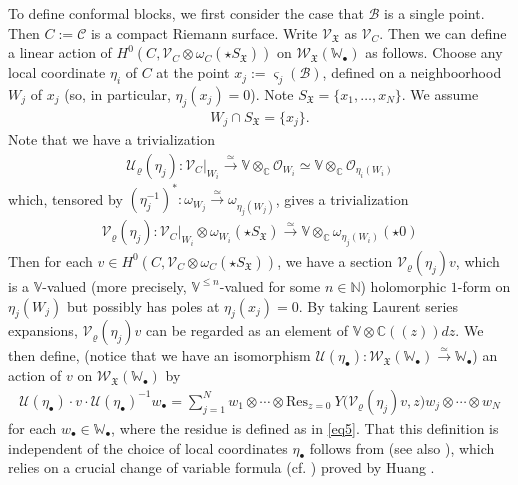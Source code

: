 \documentclass[12pt,a4paper,notitlepage]{article}
\theoremstyle{definition}
\theoremstyle{plain}
\newcommand{\fk}{\mathfrak}
\newcommand{\mc}{\mathcal}
\newcommand{\Res}{\mathrm{Res}}
\newcommand{\scr}{\mathscr}
\newcommand{\sgm}{\varsigma}
\newcommand{\SX}{{S_{\fk X}}}
\newcommand{\blt}{\bullet}
\newcommand{\Vbb}{\mathbb V}
\newcommand{\Wbb}{\mathbb W}
\newcommand{\Cbb}{\mathbb C}
\newcommand{\Nbb}{\mathbb N}
\numberwithin{equation}{section}
\begin{document}


To define conformal blocks, we first consider the case that $\mc B$ is a single point. Then $C:=\mc C$ is a compact Riemann surface. Write $\scr V_{\fk X}$ as $\scr V_C$. Then we can define a linear action of $H^0(C,\scr V_C\otimes\omega_C(\star\SX))$ on $\scr W_{\fk X}(\Wbb_\blt)$ as follows. Choose any local coordinate $\eta_i$ of $C$ at the point $x_j:=\sgm_j(\mc B)$, defined on a neighboorhood $W_j$ of $x_j$ (so, in particular, $\eta_j(x_j)=0$). Note $\SX=\{x_1,\dots,x_N\}$. We assume
\begin{align*}
W_j\cap\SX=\{x_j\}.	
\end{align*}
Note that we have a trivialization
\begin{align*}
\mc U_\varrho(\eta_j):\scr V_C|_{W_i}\xrightarrow{\simeq} \Vbb\otimes_\Cbb\scr O_{W_i}\simeq	\Vbb\otimes_\Cbb\scr O_{\eta_i(W_i)}
\end{align*} 
which, tensored by $(\eta_j^{-1})^*:\omega_{W_j}\xrightarrow{\simeq}\omega_{\eta_j(W_j)}$, gives a trivialization \index{V@$\mc V_\varrho(\eta_j)$}
\begin{align*}
\mc V_\varrho(\eta_j):\scr V_C|_{W_i}\otimes\omega_{W_i}(\star\SX)\xrightarrow{\simeq} \Vbb\otimes_\Cbb\omega_{\eta_j(W_i)}(\star 0)	
\end{align*} 
Then for each $v\in H^0(C,\scr V_C\otimes\omega_C(\star\SX))$, we have a section $\mc V_\varrho(\eta_j)v$, which is a $\Vbb$-valued (more precisely, $\Vbb^{\leq n}$-valued for some $n\in\Nbb$) holomorphic $1$-form on $\eta_j(W_j)$ but possibly has poles at $\eta_j(x_j)=0$. By taking Laurent series expansions, $\mc V_\varrho(\eta_j)v$ can be regarded as an element of $\Vbb\otimes\Cbb((z))dz$. We then define, (notice that we have an isomorphism $\mc U(\eta_\blt):\scr W_{\fk X}(\Wbb_\blt)\xrightarrow{\simeq}\Wbb_\blt$) an action of $v$ on $\scr W_{\fk X}(\Wbb_\blt)$ by
\begin{align*}
\mc U(\eta_\blt)\cdot v\cdot \mc U(\eta_\blt)^{-1}w_\blt=\sum_{j=1}^N w_1\otimes\cdots\otimes \Res_{z=0}~Y\big(\mc V_\varrho(\eta_j)v,z\big)w_j\otimes\cdots\otimes w_N
\end{align*}
for each $w_\blt\in\Wbb_\blt$, where the residue is defined as in \eqref{eq5}. That this definition is independent of the choice of local coordinates $\eta_\blt$ follows from \cite[Thm. 6.5.4]{FB04} (see also \cite[Thm. 3.2]{Gui20}), which relies on a crucial change of variable formula (cf. \cite[Thm. 3.3]{Gui20}) proved by Huang \cite{Hua97}.
\end{document}
